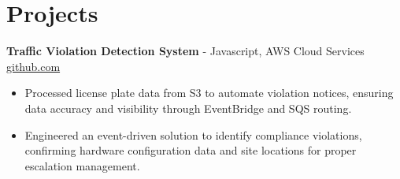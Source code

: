 \documentclass[11pt]{article}       %
\begin{document}

\vspace{-18.5pt}

\section*{Projects}

\textbf{Traffic Violation Detection System}{ - Javascript, AWS Cloud Services} \hfill \href{https://github.com/Monica20030707/AWS_rekonigition-N-read-database}{github.com} \\
\vspace{-9pt}
\begin{itemize}
  \item Processed license plate data from S3 to automate violation notices, ensuring data accuracy and visibility through EventBridge and SQS routing.
  \item Engineered an event-driven solution to identify compliance violations, confirming hardware configuration data and site locations for proper escalation management.
\end{itemize}

\end{document}
